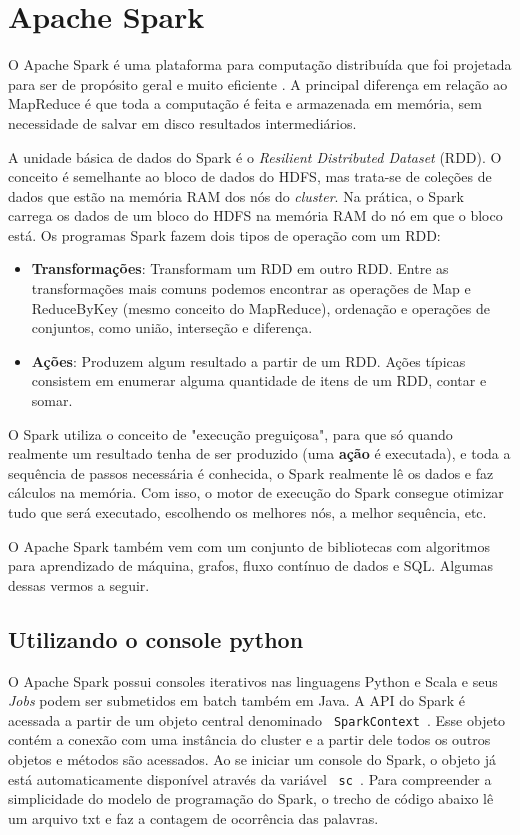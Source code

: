 \section{Apache Spark}
O Apache Spark é uma plataforma para computação distribuída que foi projetada para ser de propósito geral e muito eficiente \cite{karau2015learning}. A principal diferença em relação ao MapReduce é que toda a computação é feita e armazenada em memória, sem necessidade de salvar em disco resultados intermediários. 

A unidade básica de dados do Spark é o \textit{Resilient Distributed Dataset} (RDD). O conceito é semelhante ao bloco de dados do HDFS, mas trata-se de coleções de dados que estão na memória RAM dos nós do \textit{cluster}. Na prática, o Spark carrega os dados de um bloco do HDFS na memória RAM do nó em que o bloco está. Os programas Spark fazem dois tipos de operação com um RDD:
\begin{itemize}
	\item \textbf{Transformações}: Transformam um RDD em outro RDD. Entre as transformações mais comuns podemos encontrar as operações de Map e ReduceByKey (mesmo conceito do MapReduce), ordenação e operações de conjuntos, como união, interseção e diferença.
	\item \textbf{Ações}: Produzem algum resultado a partir de um RDD. Ações típicas consistem em enumerar alguma quantidade de itens de um RDD, contar e somar. 
\end{itemize}

O Spark utiliza o conceito de "execução preguiçosa", para que só quando realmente um resultado tenha de ser produzido (uma \textbf{ação} é executada), e toda a sequência de passos necessária é conhecida, o Spark realmente lê os dados e faz cálculos na memória. Com isso, o motor de execução do Spark consegue otimizar tudo que será executado, escolhendo os melhores nós, a melhor sequência, etc.

O Apache Spark também vem com um conjunto de bibliotecas com algoritmos para aprendizado de máquina, grafos, fluxo contínuo de dados e SQL. Algumas dessas vermos a seguir.

\subsection{Utilizando o console python}
O Apache Spark possui consoles iterativos nas linguagens Python e Scala e seus \textit{Jobs} podem ser submetidos em batch também em Java. A API do Spark é acessada a partir de um objeto central denominado \texttt{ SparkContext }. Esse objeto contém a conexão com uma instância do cluster e a partir dele todos os outros objetos e métodos são acessados. Ao se iniciar um console do Spark, o objeto já está automaticamente disponível através da variável \texttt{ sc }. Para compreender a simplicidade do modelo de programação do Spark, o trecho de código abaixo lê um arquivo txt e faz a contagem de ocorrência das palavras.

